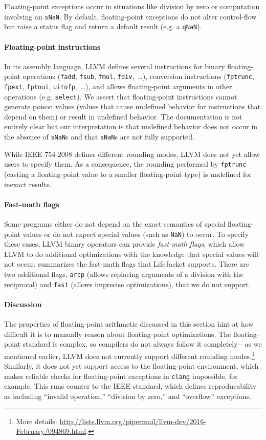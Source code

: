 \documentclass[preprint, numbers]{sigplanconf}
\newcommand{\xxx}{LifeJacket}
\begin{document}
Floating-point exceptions occur in situations like division by zero or
computation involving an \texttt{sNaN}. By default, floating-point exceptions
do not alter control-flow but raise a status flag and return a default result
(e.g. a \texttt{qNaN}).

\paragraph{Floating-point instructions} In its assembly language, LLVM defines
several instructions for binary floating-point operations (\texttt{fadd},
\texttt{fsub}, \texttt{fmul}, \texttt{fdiv},~\ldots), conversion instructions
(\texttt{fptrunc}, \texttt{fpext}, \texttt{fptoui}, \texttt{uitofp},~\ldots),
and allows floating-point arguments in other operations (e.g. \texttt{select}).
We assert that floating-point instructions cannot generate poison values
(values that cause undefined behavior for instructions that depend on them) or
result in undefined behavior. The documentation is not entirely clear but our
interpretation is that undefined behavior does not occur in the absence of
\texttt{sNaN}s and that \texttt{sNaN}s are not fully supported.

While IEEE 754-2008 defines different rounding modes, LLVM does not yet allow
users to specify them. As a consequence, the rounding performed by
\texttt{fptrunc} (casting a floating-point value to a smaller floating-point
type) is undefined for inexact results.

\paragraph{Fast-math flags}
Some programs either do not depend on the exact
semantics of special floating-point values or do not expect special values
(such as \texttt{NaN}) to occur. To specify these cases, LLVM binary operators can
provide \emph{fast-math flags}, which allow LLVM to do additional optimizations with
the knowledge that special values will not occur. 
summarizes the fast-math flags that \xxx{} supports. There are two additional
flags, \texttt{arcp} (allows replacing arguments of a division with the
reciprocal) and \texttt{fast} (allows imprecise optimizations), that we do not
support.

\paragraph{Discussion} The properties of floating-point arithmetic discussed in
this section hint at how difficult it is to manually reason about
floating-point optimizations. The floating-point standard is complex, so
compilers do not always follow it completely---as we mentioned earlier, LLVM
does not currently support different rounding modes.\footnote{More details:
\url{http://lists.llvm.org/pipermail/llvm-dev/2016-February/094869.html}.}
Similarly, it does not yet support access to the floating-point environment,
which makes reliable checks for floating-point exceptions in \texttt{clang}
impossible, for example. This runs counter to the IEEE standard, which defines
reproducability as including ``invalid operation,'' ``division by zero,'' and
``overflow'' exceptions.
\end{document}
